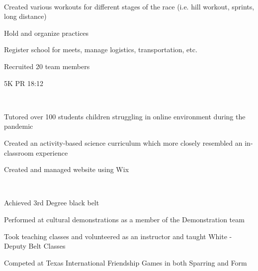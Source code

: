 \documentclass[a4paper]{MagicalCV}
\begin{document}
\begin{flushleft}
 \\
\vspace{\topsep} %
\begin{tightemize}
\item Created various workouts for different stages of the race (i.e. hill workout, sprints, long distance)
\item Hold and organize practices
\item Register school for meets, manage logistics, transportation, etc.
\item Recruited 20 team members
\item 5K PR 18:12
\end{tightemize}
\sectionsep  

 \\
\vspace{\topsep} %
\begin{tightemize}
\item Tutored over 100 students children struggling in online environment during the pandemic
\item Created an activity-based science curriculum which more closely resembled an in-classroom experience
\item Created and managed website using Wix
\end{tightemize}
\sectionsep  

 \\
\vspace{\topsep} %
\begin{tightemize}
\item Achieved 3rd Degree black belt
\item Performed at cultural demonstrations as a member of the Demonstration team
\item Took teaching classes and volunteered as an instructor and taught White - Deputy Belt Classes
\item Competed at Texas International Friendship Games in both Sparring and Form
\end{tightemize}
\sectionsep 


\end{flushleft}
\end{document}
